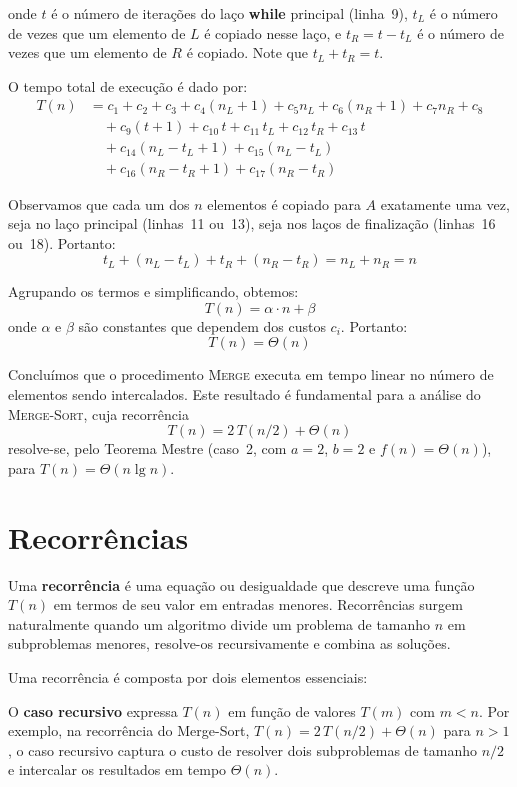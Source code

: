 \documentclass[9pt,a4paper]{extarticle}
\begin{document}
\noindent onde $t$ é o número de iterações do laço \textbf{while} principal (linha~9), $t_L$ é o número de vezes que um elemento de $L$ é copiado nesse laço, e $t_R = t - t_L$ é o número de vezes que um elemento de $R$ é copiado. Note que $t_L + t_R = t$.

O tempo total de execução é dado por:
\begin{align*}
T(n) &= c_1 + c_2 + c_3 + c_4(n_L + 1) + c_5 n_L + c_6(n_R + 1) + c_7 n_R + c_8 \\
     &\quad + c_9(t + 1) + c_{10}\, t + c_{11}\, t_L + c_{12}\, t_R + c_{13}\, t \\
     &\quad + c_{14}(n_L - t_L + 1) + c_{15}(n_L - t_L) \\
     &\quad + c_{16}(n_R - t_R + 1) + c_{17}(n_R - t_R)
\end{align*}

Observamos que cada um dos $n$ elementos é copiado para $A$ exatamente uma vez, seja no laço principal (linhas~11 ou~13), seja nos laços de finalização (linhas~16 ou~18). Portanto:
\[
t_L + (n_L - t_L) + t_R + (n_R - t_R) = n_L + n_R = n
\]

Agrupando os termos e simplificando, obtemos:
\[
T(n) = \alpha \cdot n + \beta
\]
onde $\alpha$ e $\beta$ são constantes que dependem dos custos $c_i$. Portanto:
\[
T(n) = \Theta(n)
\]

Concluímos que o procedimento \textsc{Merge} executa em tempo linear no número de elementos sendo intercalados. Este resultado é fundamental para a análise do \textsc{Merge-Sort}, cuja recorrência
\[
T(n) = 2\,T(n/2) + \Theta(n)
\]
resolve-se, pelo Teorema Mestre (caso~2, com $a = 2$, $b = 2$ e $f(n) = \Theta(n)$), para $T(n) = \Theta(n \lg n)$.

\section{Recorrências}

Uma \textbf{recorrência} é uma equação ou desigualdade que descreve uma função $T(n)$ em termos de seu valor em entradas menores. Recorrências surgem naturalmente quando um algoritmo divide um problema de tamanho $n$ em subproblemas menores, resolve-os recursivamente e combina as soluções.

Uma recorrência é composta por dois elementos essenciais:

O \textbf{caso recursivo} expressa $T(n)$ em função de valores $T(m)$ com $m < n$. Por exemplo, na recorrência do Merge-Sort, $T(n) = 2\,T(n/2) + \Theta(n)$ para $n > 1$, o caso recursivo captura o custo de resolver dois subproblemas de tamanho $n/2$ e intercalar os resultados em tempo $\Theta(n)$.
\end{document}
